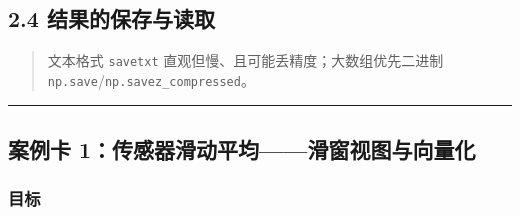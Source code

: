 \subsection{2.4
结果的保存与读取}\label{ux7ed3ux679cux7684ux4fddux5b58ux4e0eux8bfbux53d6}

\begin{Shaded}
\begin{Highlighting}[]
\OperatorTok{=}\NormalTok{ np.array([[}\NormalTok{, }\NormalTok{], [}\NormalTok{, }\NormalTok{]])}

\OperatorTok{=}\OperatorTok{=}\NormalTok{)}
\OperatorTok{=}\OperatorTok{=}\NormalTok{)}

\OperatorTok{=}\NormalTok{)}

\OperatorTok{=}\OperatorTok{=}
\OperatorTok{=}\NormalTok{)}
\NormalTok{d[}\NormalTok{], d[}\NormalTok{]}
\end{Highlighting}
\end{Shaded}

\begin{quote}
文本格式 \texttt{savetxt} 直观但慢、且可能丢精度；大数组优先二进制
\texttt{np.save}/\texttt{np.savez\_compressed}。
\end{quote}

\begin{center}\rule{0.5\linewidth}{0.5pt}\end{center}

\subsection{案例卡
1：传感器滑动平均------滑窗视图与向量化}\label{ux6848ux4f8bux5361-1ux4f20ux611fux5668ux6ed1ux52a8ux5e73ux5747ux6ed1ux7a97ux89c6ux56feux4e0eux5411ux91cfux5316}

\subsubsection{目标}\label{ux76eeux6807-3}

